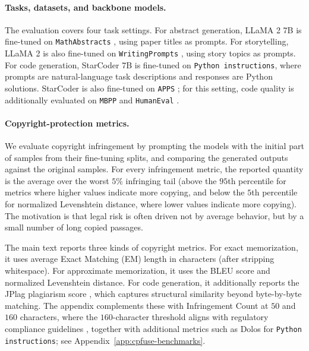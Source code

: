 \paragraph{Tasks, datasets, and backbone models.}
The evaluation covers four task settings. For abstract generation, LLaMA 2 7B \citep{touvron2023llama} is fine-tuned on \texttt{MathAbstracts} \citep{zhang2024autonomous}, using paper titles as prompts. For storytelling, LLaMA 2 is also fine-tuned on \texttt{WritingPrompts} \citep{fan2018hierarchical}, using story topics as prompts. For code generation, StarCoder 7B \citep{li2023starcoder} is fine-tuned on \texttt{Python instructions}, where prompts are natural-language task descriptions and responses are Python solutions. StarCoder is also fine-tuned on \texttt{APPS} \citep{hendrycksapps2021}; for this setting, code quality is additionally evaluated on \texttt{MBPP} \citep{austin2021program} and \texttt{HumanEval} \citep{chen2021evaluating}.

\paragraph{Copyright-protection metrics.}
We evaluate copyright infringement by prompting the models with the initial part of samples from their fine-tuning splits, and comparing the generated outputs against the original samples. For every infringement metric, the reported quantity is the average over the worst \(5\%\) infringing tail (above the \(95\)th percentile for metrics where higher values indicate more copying, and below the \(5\)th percentile for normalized Levenshtein distance, where lower values indicate more copying). The motivation is that legal risk is often driven not by average behavior, but by a small number of long copied passages.

The main text reports three kinds of copyright metrics. For exact memorization, it uses average Exact Matching (EM) length in characters (after stripping whitespace). For approximate memorization, it uses the BLEU score and normalized Levenshtein distance. For code generation, it additionally reports the JPlag plagiarism score \citep{prechelt2002finding}, which captures structural similarity beyond byte-by-byte matching. The appendix complements these with Infringement Count at \(50\) and \(160\) characters, where the \(160\)-character threshold aligns with regulatory compliance guidelines \citep{mueller2024llms}, together with additional metrics such as Dolos \citep{maertens2022dolos} for \texttt{Python instructions}; see Appendix~\ref{app:cpfuse-benchmarks}.

